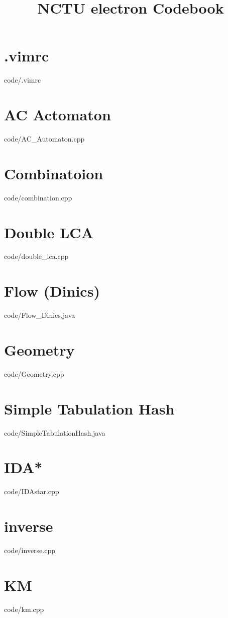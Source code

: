 \documentclass [10pt,a4paper,twocolumn]{article}
\title {NCTU electron Codebook}
\begin{document}
\maketitle
\tableofcontents
\section{.vimrc}
 {code/.vimrc}
\section{AC Actomaton}
 {code/AC_Automaton.cpp}
\section{Combinatoion}
 {code/combination.cpp}
\section{Double LCA}
 {code/double_lca.cpp}
\section{Flow (Dinics)}
 {code/Flow_Dinics.java}
\section{Geometry}
 {code/Geometry.cpp}
\section{Simple Tabulation Hash}
 {code/SimpleTabulationHash.java}
\section{IDA*}
 {code/IDAstar.cpp}
\section{inverse}
 {code/inverse.cpp}
\section{KM}
 {code/km.cpp}
\end{document}

